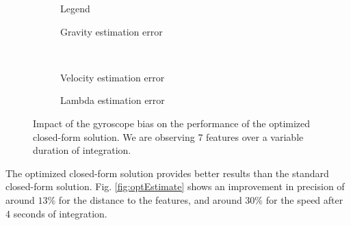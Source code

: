 \documentclass[letterpaper, 10 pt, journal, final]{ieeeconf}  %
\begin{document}
\begin{figure}
  \centering
        \hspace{0.2\columnwidth}%
        \begin{subfigure}[b]{0.3\columnwidth}
                \resizebox{\columnwidth}{!}{}
                \caption{Legend}

        \end{subfigure}%
        \begin{subfigure}[b]{0.5\columnwidth}
                \resizebox{\columnwidth}{!}{}
                \caption{Gravity estimation error}

        \end{subfigure}
        ~
        \begin{subfigure}[b]{0.5\columnwidth}
                \resizebox{\columnwidth}{!}{}
                \caption{Velocity estimation error}

        \end{subfigure}%
        \begin{subfigure}[b]{0.5\columnwidth}
                \resizebox{\columnwidth}{!}{}
                \caption{Lambda estimation error}

        \end{subfigure}
        \caption{Impact of the gyroscope bias on the performance of the optimized closed-form solution. We are observing 7 features  over a variable duration of integration. \label{fig:biasGyroOpt}}
\end{figure}


The optimized closed-form solution provides better results than the standard closed-form solution. Fig. \ref{fig:optEstimate} shows an improvement in precision of around $13\%$ for the distance to the features, and around $30\%$ for the speed after 4 seconds of integration.

\end{document}
